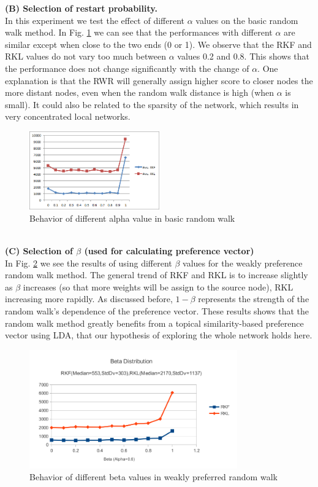 \documentclass{article} %
\begin{document}
\textbf{(B) Selection of restart probability.}\\
In this experiment we test the effect of different $\alpha$ values on the basic random walk method. In Fig. \ref{fig:evalAlpha} we can see that the performances with different $\alpha$ are similar except when close to the two ends (0 or 1). We observe that the RKF and RKL values do not vary too much between $\alpha$ values 0.2 and 0.8. This shows that the performance does not change significantly with the change of $\alpha$. One explanation is that the RWR will generally assign higher score to closer nodes the more distant nodes, even when the random walk distance is high (when $\alpha$ is small). It could also be related to the sparsity of the network, which results in very concentrated local networks.\\ 
\begin{figure}[htb]
\centering
\includegraphics[width=0.5\textwidth]{evalAlpha}
\caption{Behavior of different alpha value in basic random walk}
\label{fig:evalAlpha}
\end{figure}
\\
\textbf{(C) Selection of $\beta$ (used for calculating preference vector)}\\
In Fig. \ref{fig:evalBeta} we see the results of using different $\beta$ values for the weakly preference random walk method. The general trend of RKF and RKL is to increase slightly as $\beta$ increases (so that more weights will be assign to the source node), RKL increasing more rapidly. As discussed before, $1-\beta$ represents the strength of the random walk's dependence of the preference vector. These results shows that the random walk method greatly benefits from a topical similarity-based preference vector using LDA, that our hypothesis of exploring the whole network holds here.\\
\begin{figure}[htb]
\centering
\includegraphics[width=0.8\textwidth]{beta.png}
\caption{Behavior of different beta values in weakly preferred random walk}
\label{fig:evalBeta}
\end{figure}
\end{document}
